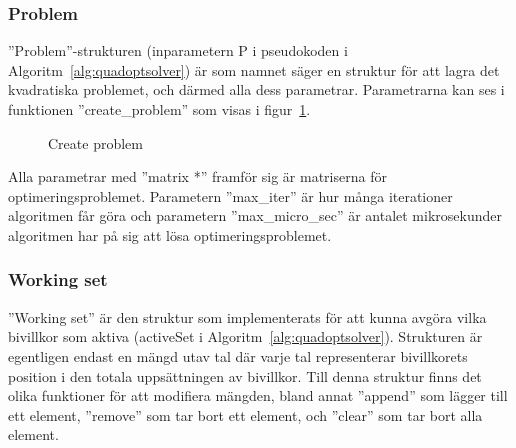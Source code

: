 \subsubsection{Problem}
''Problem''-strukturen (inparametern P i pseudokoden i Algoritm~\ref{alg:quadoptsolver}) är som namnet säger en struktur för att lagra det kvadratiska problemet, och därmed alla dess parametrar. Parametrarna kan ses i funktionen ''create\_problem'' som visas i figur~\ref{fig:createproblem}. 

\begin{figure}[H]

\caption{Create problem}
\label{fig:createproblem}
\end{figure}  

Alla parametrar med ''matrix *'' framför sig är matriserna för optimeringsproblemet. Parametern ''max\_iter'' är hur många iterationer algoritmen får göra och parametern ''max\_micro\_sec'' är antalet mikrosekunder algoritmen har på sig att lösa optimeringsproblemet. 

\subsubsection{Working set}
''Working set'' är den struktur som implementerats för att kunna avgöra vilka bivillkor som aktiva (activeSet i Algoritm~\ref{alg:quadoptsolver}). Strukturen är egentligen endast en mängd utav tal där varje tal representerar bivillkorets position i den totala uppsättningen av bivillkor. Till denna struktur finns det olika funktioner för att modifiera mängden, bland annat ''append'' som lägger till ett element, ''remove'' som tar bort ett element, och ''clear'' som tar bort alla element.




